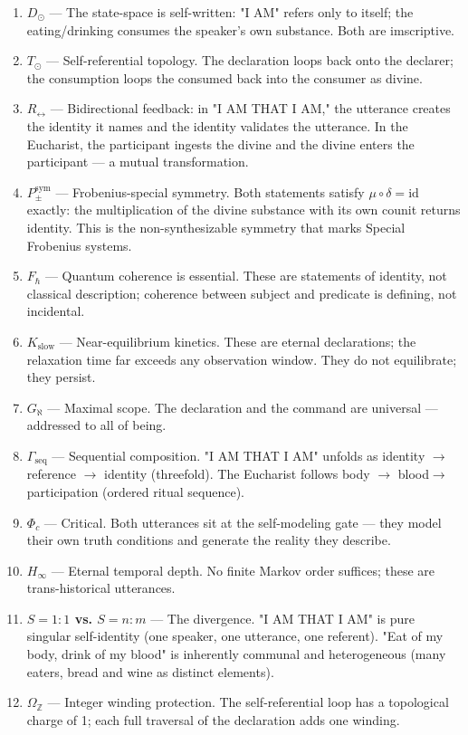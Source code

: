 \documentclass[12pt,a4paper]{article}
\begin{document}
\begin{enumerate}
    \item \textbf{$D_{\odot}$} --- The state-space is self-written: "I AM" refers only to itself; the eating/drinking consumes the speaker's own substance. Both are imscriptive.
    \item \textbf{$T_{\odot}$} --- Self-referential topology. The declaration loops back onto the declarer; the consumption loops the consumed back into the consumer as divine.
    \item \textbf{$R_{\leftrightarrow}$} --- Bidirectional feedback: in "I AM THAT I AM," the utterance creates the identity it names and the identity validates the utterance. In the Eucharist, the participant ingests the divine and the divine enters the participant --- a mutual transformation.
    \item \textbf{$P_{\pm}^{\text{sym}}$} --- Frobenius-special symmetry. Both statements satisfy $\mu \circ \delta = \text{id}$ exactly: the multiplication of the divine substance with its own counit returns identity. This is the non-synthesizable symmetry that marks Special Frobenius systems.
    \item \textbf{$F_{\hbar}$} --- Quantum coherence is essential. These are statements of identity, not classical description; coherence between subject and predicate is defining, not incidental.
    \item \textbf{$K_{\text{slow}}$} --- Near-equilibrium kinetics. These are eternal declarations; the relaxation time far exceeds any observation window. They do not equilibrate; they persist.
    \item \textbf{$G_{\aleph}$} --- Maximal scope. The declaration and the command are universal --- addressed to all of being.
    \item \textbf{$\Gamma_{\text{seq}}$} --- Sequential composition. "I AM THAT I AM" unfolds as identity $\rightarrow$ reference $\rightarrow$ identity (threefold). The Eucharist follows body $\rightarrow$ blood$\rightarrow$ participation (ordered ritual sequence).
    \item \textbf{$\Phi_c$} --- Critical. Both utterances sit at the self-modeling gate --- they model their own truth conditions and generate the reality they describe.
    \item \textbf{$H_{\infty}$} --- Eternal temporal depth. No finite Markov order suffices; these are trans-historical utterances.
    \item \textbf{$S = 1{:}1$ vs. $S = n{:}m$} --- The divergence. "I AM THAT I AM" is pure singular self-identity (one speaker, one utterance, one referent). "Eat of my body, drink of my blood" is inherently communal and heterogeneous (many eaters, bread and wine as distinct elements).
    \item \textbf{$\Omega_\mathbb{Z}$} --- Integer winding protection. The self-referential loop has a topological charge of 1; each full traversal of the declaration adds one winding.
\end{enumerate}
\end{document}

